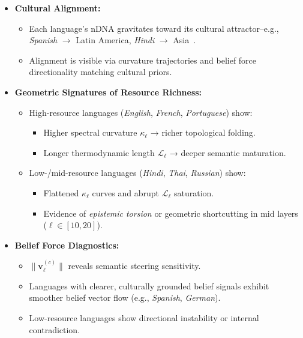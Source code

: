 \begin{itemize}[leftmargin=1.5em]
  \item \textbf{Cultural Alignment:}
  \begin{itemize}
    \item Each language’s nDNA gravitates toward its cultural attractor--e.g., \emph{Spanish} $\rightarrow$ Latin America, \emph{Hindi} $\rightarrow$ Asia~\citep{mager2018lost, adelani2021massively}.
    \item Alignment is visible via curvature trajectories and belief force directionality matching cultural priors.
  \end{itemize}

  \item \textbf{Geometric Signatures of Resource Richness:}
  \begin{itemize}[leftmargin=1.5em]
    \item High-resource languages (\emph{English}, \emph{French}, \emph{Portuguese}) show:
    \begin{itemize}
      \item Higher spectral curvature $\kappa_\ell$ → richer topological folding.
      \item Longer thermodynamic length $\mathcal{L}_\ell$ → deeper semantic maturation.
    \end{itemize}
    \item Low-/mid-resource languages (\emph{Hindi}, \emph{Thai}, \emph{Russian}) show:
    \begin{itemize}[leftmargin=1.5em]
      \item Flattened $\kappa_\ell$ curves and abrupt $\mathcal{L}_\ell$ saturation.
      \item Evidence of \emph{epistemic torsion} or geometric shortcutting in mid layers ($\ell \in [10, 20]$).
    \end{itemize}
  \end{itemize}

  \item \textbf{Belief Force Diagnostics:}
  \begin{itemize}[leftmargin=1.5em]
    \item $\|\mathbf{v}_\ell^{(c)}\|$ reveals semantic steering sensitivity.
    \item Languages with clearer, culturally grounded belief signals exhibit smoother belief vector flow (e.g., \emph{Spanish}, \emph{German}).
    \item Low-resource languages show directional instability or internal contradiction.
  \end{itemize}


\end{itemize}
